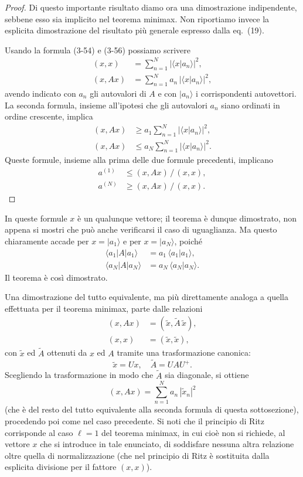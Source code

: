 \documentclass[11pt, a4paper]{book}
\numberwithin{equation}{section}
\begin{document}
\begin{proof}
Di questo importante risultato diamo ora una dimostrazione indipendente,
sebbene esso sia implicito nel teorema minimax. Non riportiamo invece la
esplicita dimostrazione del risultato più generale espresso dalla eq.\ (19).

Usando la formula (3-54) e (3-56) possiamo scrivere
\begin{align*}
(x,x) &= \sum_{n=1}^{N} |\langle x|a_n\rangle|^2, \\
(x,Ax) &= \sum_{n=1}^{N} a_n\,|\langle x|a_n\rangle|^2,
\end{align*}
avendo indicato con $a_n$ gli autovalori di $A$ e con $|a_n\rangle$ i
corrispondenti autovettori. La seconda formula, insieme all'ipotesi che gli
autovalori $a_n$ siano ordinati in ordine crescente, implica
\begin{align*}
(x,Ax) &\geq a_1 \sum_{n=1}^{N} |\langle x|a_n\rangle|^2, \\
(x,Ax) &\leq a_N \sum_{n=1}^{N} |\langle x|a_n\rangle|^2.
\end{align*}
Queste formule, insieme alla prima delle due formule precedenti, implicano
\begin{align*}
a^{(1)} &\leq (x,Ax)\,/\,(x,x), \\
a^{(N)} &\geq (x,Ax)\,/\,(x,x).
\end{align*}
\end{proof}

In queste formule $x$ è un qualunque vettore; il teorema è dunque
dimostrato, non appena si mostri che può anche verificarsi il caso di
uguaglianza. Ma questo chiaramente accade per $x = |a_1\rangle$ e per
$x = |a_N\rangle$, poiché
\begin{align*}
\langle a_1|A|a_1\rangle &= a_1\,\langle a_1|a_1\rangle, \\
\langle a_N|A|a_N\rangle &= a_N\,\langle a_N|a_N\rangle.
\end{align*}
Il teorema è così dimostrato.

Una dimostrazione del tutto equivalente, ma più direttamente analoga a
quella effettuata per il teorema minimax, parte dalle relazioni
\begin{align*}
(x,Ax) &= (\widetilde{x}, \widetilde{A}\,\widetilde{x}), \\
(x,x)  &= (\widetilde{x}, \widetilde{x}),
\end{align*}
con $\widetilde{x}$ ed $\widetilde{A}$ ottenuti da $x$ ed $A$ tramite una
trasformazione canonica:
\[
\widetilde{x} = Ux, \quad \widetilde{A} = UAU^+.
\]
Scegliendo la trasformazione in modo che $\widetilde{A}$ sia diagonale, si
ottiene
\[
(x, Ax) = \sum_{n=1}^{N} a_n\,|\widetilde{x}_n|^2
\]
(che è del resto del tutto equivalente alla seconda formula di questa
sottosezione), procedendo poi come nel caso precedente. Si noti che il
principio di Ritz corrisponde al caso $\ell = 1$ del teorema minimax, in
cui cioè non si richiede, al vettore $x$ che si introduce in tale
enunciato, di soddisfare nessuna altra relazione oltre quella di
normalizzazione (che nel principio di Ritz è sostituita dalla esplicita
divisione per il fattore $(x,x)$).
\end{document}
